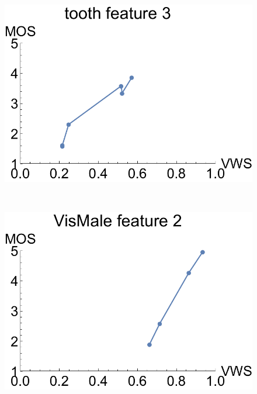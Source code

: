\begin{figure}
\begin{minipage}{.25\textwidth}
		\subcaption{}
	\end{minipage}~
	\begin{minipage}{.25\textwidth}
		\includegraphics[width=1\linewidth]{figures/mos_vs_metric_tooth_feature_3}
		\subcaption{}
	\end{minipage}~
	\begin{minipage}{.25\textwidth}
		\includegraphics[width=1\linewidth]{figures/mos_vs_metric_VisMale_feature_2}
		\subcaption{}
	\end{minipage}~
	\begin{minipage}{.25\textwidth}

\end{minipage}
\end{figure}
